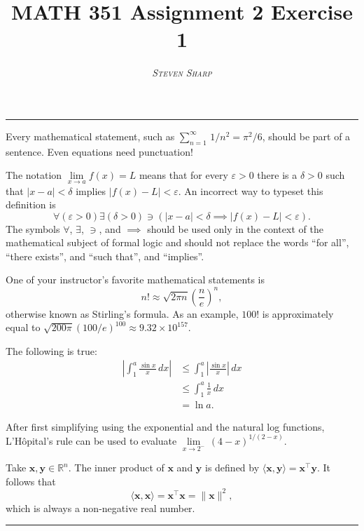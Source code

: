 \documentclass[10pt]{article}
\title{MATH 351 Assignment 2 Exercise 1}
\author{\textsc{\textit{Steven Sharp}}}
\date{}
\begin{document}
\maketitle

\thispagestyle{empty}

\begin{center}
\rule{\textwidth}{0.5pt}
\end{center}

Every mathematical statement, such as $\sum^\infty_{n=1} \, 1/n^2 = \pi^2/6$, should be part of a sentence. Even equations need punctuation!

The notation $\underset{x \to a}{\lim} f(x) = L$ means that for every $\varepsilon > 0$ there is a $\delta > 0$ such that $|x - a| < \delta$ implies $|f(x) - L| < \varepsilon$. An incorrect way to typeset this definition is
\begin{equation*}
\forall(\varepsilon > 0)\exists(\delta > 0)\ni(|x-a|<\delta\implies|f(x) - L| < \varepsilon).
\end{equation*}
The symbols $\forall$, $\exists$, $\ni$, and $\implies$ should be used only in the context of the mathematical subject of formal logic and should not replace the words ``for all'', ``there exists'', and ``such that'', and ``implies''.

One of your instructor's favorite mathematical statements is
\begin{equation*}
n!\approx\sqrt{2\pi n}\left({\frac{n}{e}}\right)^n,
\end{equation*}
otherwise known as Stirling's formula. As an example, $100!$ is approximately equal to $\sqrt{200\pi}(100/e)^{100}\approx9.32\times10^{157}$.

The following is true:
\begin{align*}
\left| \int_1^a \frac{\sin x}{x} \, dx\right| & \leq \int_1^a \left| \frac{\sin x}{x}\right| \, dx \\
& \leq \int_1^a \frac{1}{x} \, dx \\
& = \ln a.
\end{align*}

After first simplifying using the exponential and the natural log functions, L'H\^opital's rule can be used to evaluate $\underset{x \to 2^-}{\lim}\,(4-x)^{1/(2-x)}$.

Take $\mathbf{x}, \mathbf{y} \in \mathbb{R}^n$. The inner product of $\mathbf{x}$ and $\mathbf{y}$ is defined by $\langle\mathbf{x},\mathbf{y}\rangle = \mathbf{x}^\intercal\mathbf{y}$. It follows that
\begin{equation*}
\langle\mathbf{x}, \mathbf{x}\rangle = \mathbf{x}^\intercal\mathbf{x} = \|\mathbf{x}\|^2,
\end{equation*}
which is always a non-negative real number.

\begin{center}
\rule{\textwidth}{0.5pt}
\end{center}
\end{document}
